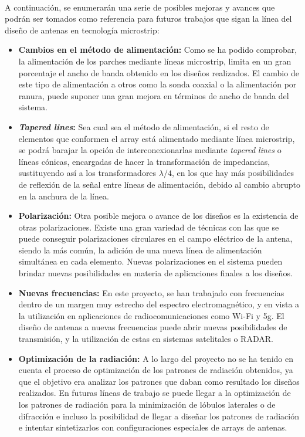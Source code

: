 \\
\par A continuación, se enumerarán una serie de posibles mejoras y avances que podrán ser tomados como referencia para futuros trabajos que sigan la línea del diseño de antenas en tecnología microstrip:
\\
\begin{itemize}
\item \textbf{Cambios en el método de alimentación: }Como se ha podido comprobar, la alimentación de los parches mediante líneas microstrip, limita en un gran porcentaje el ancho de banda obtenido en los diseños realizados. El cambio de este tipo de alimentación a otros como la sonda coaxial o la alimentación por ranura, puede suponer una gran mejora en términos de ancho de banda del sistema. 
\item \textbf{\textit{Tapered lines}: }Sea cual sea el método de alimentación, si el resto de elementos que conformen el array está alimentado mediante línea microstrip, se podrá barajar la opción de interconexionarlas mediante \textit{tapered lines} o líneas cónicas, encargadas de hacer la transformación de impedancias, sustituyendo así a los transformadores $\lambda/4$, en los que hay más posibilidades de reflexión de la señal entre líneas de alimentación, debido al cambio abrupto en la anchura de la línea.
\item \textbf{Polarización: }Otra posible mejora o avance de los diseños es la existencia de otras polarizaciones. Existe una gran variedad de técnicas con las que se puede conseguir polarizaciones circulares en el campo eléctrico de la antena, siendo la más común, la adición de una nueva línea de alimentación simultánea en cada elemento. Nuevas polarizaciones en el sistema pueden brindar nuevas posibilidades en materia de aplicaciones finales a los diseños.
\item \textbf{Nuevas frecuencias: }En este proyecto, se han trabajado con frecuencias dentro de un margen muy estrecho del espectro electromagnético, y en vista a la utilización en aplicaciones de radiocomunicaciones como Wi-Fi y \gls{5g}. El diseño de antenas a nuevas frecuencias puede abrir nuevas posibilidades de transmisión, y la utilización de estas en sistemas satelitales o RADAR.
\item \textbf{Optimización de la radiación: }A lo largo del proyecto no se ha tenido en cuenta el proceso de optimización de los patrones de radiación obtenidos, ya que el objetivo era analizar los patrones que daban como resultado los diseños realizados. En futuras líneas de trabajo se puede llegar a la optimización de los patrones de radiación para la minimización de lóbulos laterales o de difracción e incluso la posibilidad de llegar a diseñar los patrones de radiación e intentar sintetizarlos con configuraciones especiales de arrays de antenas.
\end{itemize}

